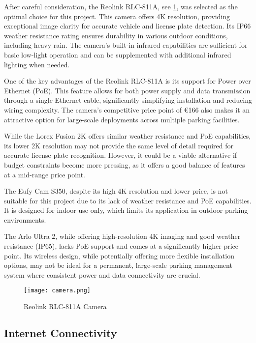 After careful consideration, the Reolink RLC-811A, see \cref{fig:camera}, was selected as the optimal choice for this project. This camera offers 4K resolution, providing exceptional image clarity for accurate vehicle and license plate detection. Its IP66 weather resistance rating ensures durability in various outdoor conditions, including heavy rain. The camera's built-in infrared capabilities are sufficient for basic low-light operation and can be supplemented with additional infrared lighting when needed.

One of the key advantages of the Reolink RLC-811A is its support for Power over Ethernet (PoE). This feature allows for both power supply and data transmission through a single Ethernet cable, significantly simplifying installation and reducing wiring complexity. The camera's competitive price point of €166 also makes it an attractive option for large-scale deployments across multiple parking facilities.

While the Lorex Fusion 2K offers similar weather resistance and PoE capabilities, its lower 2K resolution may not provide the same level of detail required for accurate license plate recognition. However, it could be a viable alternative if budget constraints become more pressing, as it offers a good balance of features at a mid-range price point.

The Eufy Cam S350, despite its high 4K resolution and lower price, is not suitable for this project due to its lack of weather resistance and PoE capabilities. It is designed for indoor use only, which limits its application in outdoor parking environments.

The Arlo Ultra 2, while offering high-resolution 4K imaging and good weather resistance (IP65), lacks PoE support and comes at a significantly higher price point. Its wireless design, while potentially offering more flexible installation options, may not be ideal for a permanent, large-scale parking management system where consistent power and data connectivity are crucial.

\begin{figure}
	\texttt{[image: camera.png]}
	\caption{Reolink RLC-811A Camera}\label{fig:camera}
\end{figure}

\subsection{Internet Connectivity}

